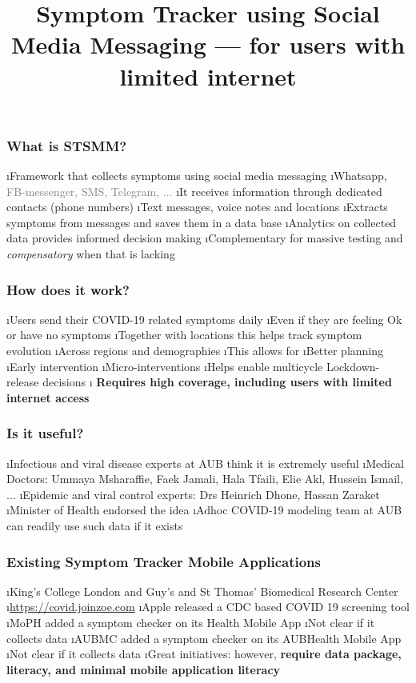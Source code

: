 \documentclass[t,xcolor=pdftex,dvipsnames,table]{beamer}
\title[ST-SMM]{Symptom Tracker using Social Media Messaging --- {\small for users with limited internet } }
\subtitle{}
\begin{document}
 

\arpctitleframe 

\begin{frame}
  \frametitle{What is STSMM?} 
  \be
  \i Framework that collects symptoms using social media messaging
    \be 
    \i Whatsapp, \textcolor{gray}{FB-messenger, SMS, Telegram, ...} 
    \ee
  \i It receives information through dedicated contacts (phone numbers)
    \be
    \i Text messages, voice notes and locations 
    \ee
  \i Extracts symptoms from messages and saves them in a data base 
    \be
    \i Analytics on collected data provides informed decision making 
    \ee
  \i Complementary for massive testing and {\em compensatory} when that is lacking 
  \ee
\end{frame}

\begin{frame}
  \frametitle{How does it work?} 
  \be
  \i Users send their COVID-19 related symptoms daily 
    \be 
    \i Even if they are feeling Ok or have no symptoms
    \ee 
  \i Together with locations this helps track symptom evolution 
    \be 
    \i Across regions and demographies
    \ee
  \i This allows for 
    \be 
    \i Better planning 
    \i Early intervention 
    \i Micro-interventions
    \i Helps enable multicycle Lockdown-release decisions 
    \ee
  \i<2-> {\bf Requires high coverage, including users with limited internet access} 
  \ee
\end{frame} 


\begin{frame}
  \frametitle{Is it useful?} 
  \be
  \i Infectious and viral disease experts at AUB think it is
extremely useful
    \be 
    \i Medical Doctors: Ummaya Msharaffie, Faek Jamali, 
                        Hala Tfaili, Elie Akl, Hussein Ismail, $\ldots$
    \i Epidemic and viral control experts: Drs Heinrich Dhone, Hassan Zaraket
    \ee 
  \i Minister of Health endorsed the idea 
  \i Adhoc COVID-19 modeling team at AUB can readily use such data if it exists
  \ee
\end{frame}


\begin{wideframe}
  \frametitle{Existing Symptom Tracker Mobile
  Applications}
  \be
  \i King's College London and Guy's and St Thomas' Biomedical Research Center
     \be \i \url{https://covid.joinzoe.com} 
     \ee
  \i Apple released a CDC based COVID 19 screening tool
  \i MoPH added a symptom checker on its Health Mobile App
    \be \i Not clear if it collects data \ee 
  \i AUBMC added a symptom checker on its AUBHealth Mobile App
    \be \i Not clear if it collects data \ee 
  \i Great initiatives: however, {\bf require data package, literacy, and
  minimal mobile application literacy}
  \ee
\end{wideframe}
\end{document}
